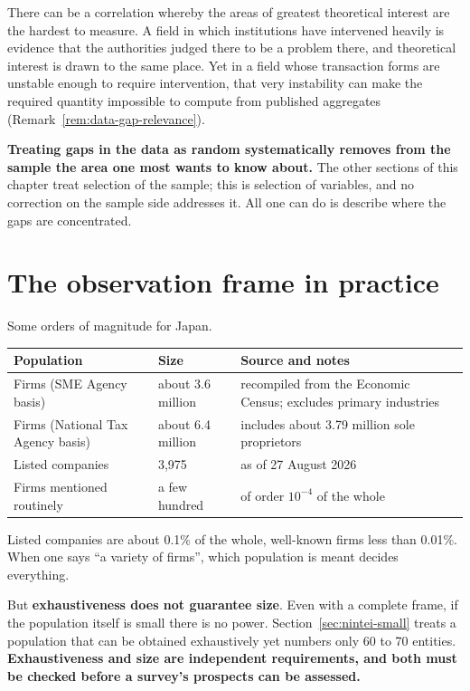 There can be a correlation whereby the areas of greatest theoretical interest are the hardest
to measure. A field in which institutions have intervened heavily is evidence that the
authorities judged there to be a problem there, and theoretical interest is drawn to the same
place. Yet in a field whose transaction forms are unstable enough to require intervention,
that very instability can make the required quantity impossible to compute from published
aggregates (Remark~\ref{rem:data-gap-relevance}).

\textbf{Treating gaps in the data as random systematically removes from the sample the area
one most wants to know about.} The other sections of this chapter treat selection of the
sample; this is selection of variables, and no correction on the sample side addresses it.
All one can do is describe where the gaps are concentrated.

\section{The observation frame in practice}
\label{sec:frame}

Some orders of magnitude for Japan.

\begin{center}
\begin{tabularx}{\textwidth}{@{}P{0.34\textwidth}lX@{}}
\toprule
Population & Size & Source and notes \\
\midrule
Firms (SME Agency basis) & about 3.6 million & recompiled from the Economic Census; excludes primary industries \\
Firms (National Tax Agency basis) & about 6.4 million & includes about 3.79 million sole proprietors \\
Listed companies & 3{,}975 & as of 27 August 2026 \\
Firms mentioned routinely & a few hundred & of order $10^{-4}$ of the whole \\
\bottomrule
\end{tabularx}
\label{tab:population-frame}
\end{center}

Listed companies are about 0.1\% of the whole, well-known firms less than 0.01\%. When one
says ``a variety of firms'', which population is meant decides everything.

But \textbf{exhaustiveness does not guarantee size}. Even with a complete frame, if the
population itself is small there is no power. Section~\ref{sec:nintei-small} treats a
population that can be obtained exhaustively yet numbers only 60 to 70 entities.
\textbf{Exhaustiveness and size are independent requirements, and both must be checked
before a survey's prospects can be assessed.}

